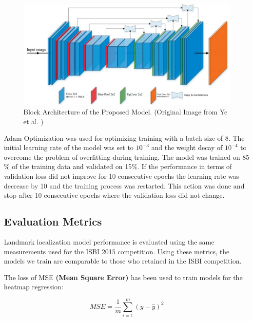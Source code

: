 \documentclass{elektr}
\begin{document}
\begin{figure}[H]
	\begin{center}
		\includegraphics[width=5.76in]{./media/image3}
		\caption{Block Architecture of the Proposed Model. (Original Image from Ye et al. \cite{ref13})}
		\label{fig3}
	\end{center}\vs{-4mm}
\end{figure}



Adam Optimization \cite{ref14} was used for optimizing training with a batch size of 8. The initial learning rate of the model was set to  \( 10^{-3} \)  and the weight decay of  \( 10^{-4} \)  to overcome the problem of overfitting during training. The model was trained on 85$\%$  of the training data and validated on 15$\%$. If the performance in terms of validation loss did not improve for 10 consecutive epochs the learning rate was decrease by 10 and the training process was restarted. This action was done and stop after 10 consecutive epochs where the validation loss did not change.

\subsection{Evaluation Metrics}

\tab Landmark localization model performance is evaluated using the same measurements used for the ISBI 2015 competition. Using these metrics, the models we train are comparable to those who retained in the ISBI competition.

\tab The loss of MSE \textbf{(Mean Square Error)} has been used to train models for the heatmap regression:



\begin{equation}
	\label{eq1}
	MSE=\frac{1}{m} \sum _{i=1}^{m} \left( y-\hat{y} \right) ^{2}
\end{equation}
\end{document}

